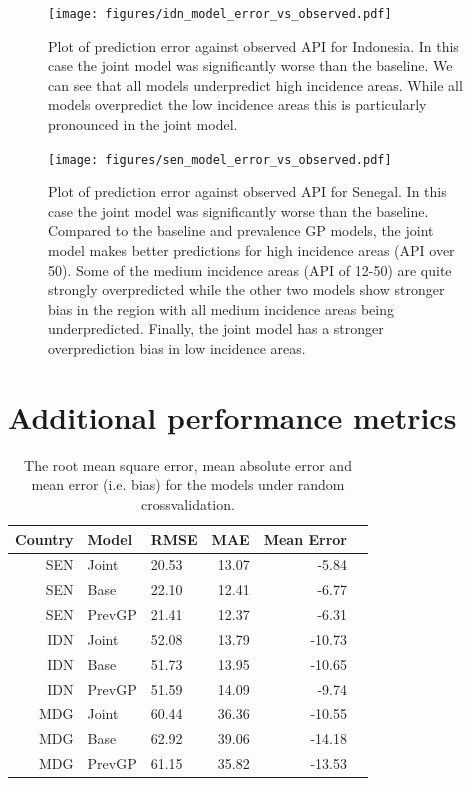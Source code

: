 \documentclass[10pt,a4]{article}
\begin{document}
\begin{figure}[h!]
\centering

\texttt{[image: figures/idn\_model\_error\_vs\_observed.pdf]}

\caption{
Plot of prediction error against observed API for Indonesia.
In this case the joint model was significantly worse than the baseline.
We can see that all models underpredict high incidence areas.
While all models overpredict the low incidence areas this is particularly pronounced in the joint model.
}

\label{idn_error_obs}
\end{figure}


\begin{figure}[h!]
\centering

\texttt{[image: figures/sen\_model\_error\_vs\_observed.pdf]}

\caption{
Plot of prediction error against observed API for Senegal.
In this case the joint model was significantly worse than the baseline.
Compared to the baseline and prevalence GP models, the joint model makes better predictions for high incidence areas (API over 50).
Some of the medium incidence areas (API of 12-50) are quite strongly overpredicted while the other two models show stronger bias in the region with all medium incidence areas being underpredicted. 
Finally, the joint model has a stronger overprediction bias in low incidence areas.
}

\label{idn_error_obs}
\end{figure}


\clearpage
\section{Additional performance metrics}

\begin{table}[ht]
\centering
\begin{tabular}{rllrrr}
  \hline
 Country & Model & RMSE & MAE & Mean Error \\ 
  \hline
SEN & Joint & 20.53 & 13.07 & -5.84 \\ 
  SEN & Base & 22.10 & 12.41 & -6.77 \\ 
  SEN & PrevGP & 21.41 & 12.37 & -6.31 \\ 
  IDN & Joint & 52.08 & 13.79 & -10.73 \\ 
  IDN & Base & 51.73 & 13.95 & -10.65 \\ 
  IDN & PrevGP & 51.59 & 14.09 & -9.74 \\ 
  MDG & Joint & 60.44 & 36.36 & -10.55 \\ 
  MDG & Base & 62.92 & 39.06 & -14.18 \\ 
  MDG & PrevGP & 61.15 & 35.82 & -13.53 \\ 
   \hline
\end{tabular}
\caption{The root mean square error, mean absolute error and mean error (i.e. bias) for the models under random crossvalidation.}
\end{table}
\end{document}
